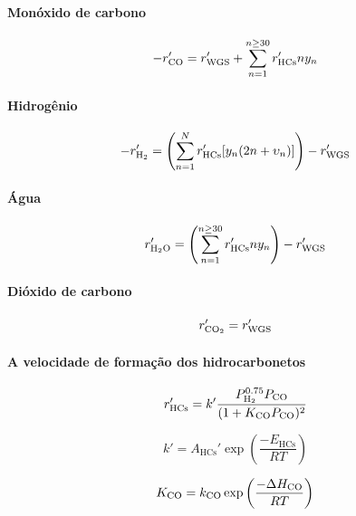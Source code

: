 \documentclass[portuguese,12pt,a4paper,onecolumn]{article}
\begin{document}
	\paragraph{Monóxido de carbono}
	\begin{equation}
		- r_{\ce{CO}}' = r_{\mathrm{WGS}}' + \sum_{n=1}^{n \geq 30} r_{\mathrm{HCs}}' n y_n
	\end{equation}
	
	\paragraph{Hidrogênio}
	\begin{equation}
		-r_{\ce{H2}}' = \left(\sum_{n = 1}^{N} r_{\mathrm{HCs}}' [y_n (2n + \upsilon_n)]\right) - r_{\mathrm{WGS}}'
		\label{eq:r_H2_simple}
	\end{equation}
	
	\paragraph{Água}
	\begin{equation}
		r_{\ce{H2O}}' = \left(\sum_{n=1}^{n \geq 30} r_{\mathrm{HCs}}' n y_n\right) - r_{\mathrm{WGS}}'
	\end{equation}
	
	\paragraph{Dióxido de carbono}
	\begin{equation}
		r_{\ce{CO2}}' = r_{\mathrm{WGS}}'
	\end{equation}
	
	\paragraph{A velocidade de formação dos hidrocarbonetos}
	
	\begin{equation}
		r_\mathrm{HCs}' = k' \frac{P_{\ce{H2}}^{0.75} P_{\ce{CO}}}{(1 + K_{\ce{CO}} P_{\ce{CO}})^2}
		\label{eq:r_HCs}
	\end{equation}
	
	\begin{equation}
		k' = A_\mathrm{HCs}' \exp \left( \frac{-E_\mathrm{HCs}}{RT} \right)
		\label{eq:k}
	\end{equation}
	
	\begin{equation}
		K_{\ce{CO}} = k_{\ce{CO}} \exp \left( \frac{-\Delta H_{\ce{CO}}}{RT} \right)
		\label{eq:K_CO}
	\end{equation}
	
\end{document}
